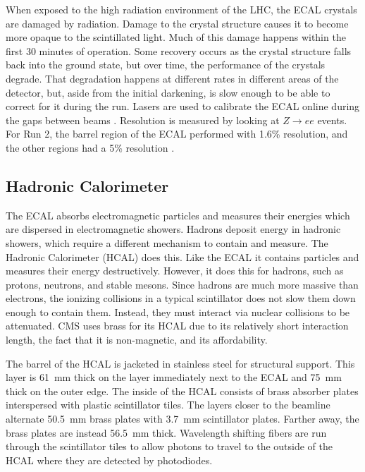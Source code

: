 When exposed to the high radiation environment of the LHC,
the ECAL crystals are damaged by radiation.
Damage to the crystal structure causes it to become more opaque to the scintillated light.
Much of this damage happens within the first 30 minutes of operation.
Some recovery occurs as the crystal structure falls back into the ground state,
but over time, the performance of the crystals degrade.
That degradation happens at different rates in different areas of the detector,
but, aside from the initial darkening,
is slow enough to be able to correct for it during the run.
Lasers are used to calibrate the ECAL online during
the gaps between beams \cite{Monti:2653861}.
Resolution is measured by looking at $Z\rightarrow ee$ events.
For Run 2, the barrel region of the ECAL performed with 1.6\% resolution,
and the other regions had a 5\% resolution \cite{Bartosik:2712238}.

\subsection{Hadronic Calorimeter}

The ECAL absorbs electromagnetic particles and measures their energies
which are dispersed in electromagnetic showers.
Hadrons deposit energy in hadronic showers,
which require a different mechanism to contain and measure.
The Hadronic Calorimeter (HCAL) does this.
Like the ECAL it contains particles and measures their energy destructively.
However, it does this for hadrons, such as protons, neutrons, and stable mesons.
Since hadrons are much more massive than electrons,
the ionizing collisions in a typical scintillator does not slow them down
enough to contain them.
Instead, they must interact via nuclear collisions to be attenuated.
CMS uses brass for its HCAL due to its relatively short interaction length,
the fact that it is non-magnetic, and its affordability.

The barrel of the HCAL is jacketed in stainless steel for structural support.
This layer is \SI{61}{mm} thick on the layer immediately next to the ECAL and
\SI{75}{mm} thick on the outer edge.
The inside of the HCAL consists of brass absorber plates
interspersed with plastic scintillator tiles.
The layers closer to the beamline alternate \SI{50.5}{mm}
brass plates with \SI{3.7}{mm} scintillator plates.
Farther away, the brass plates are instead \SI{56.5}{mm} thick.
Wavelength shifting fibers are run through the scintillator tiles
to allow photons to travel to the outside of the HCAL where they are detected by photodiodes.

